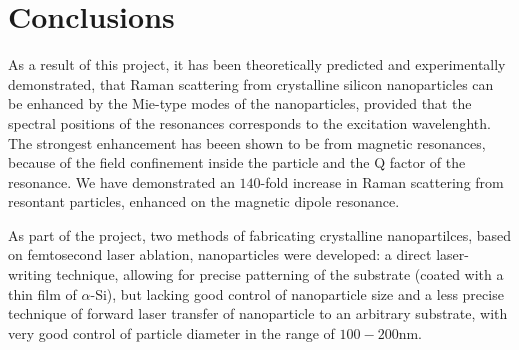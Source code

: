 \section{Conclusions}
    As a result of this project, it has been theoretically predicted and experimentally demonstrated, that Raman scattering
    from crystalline silicon nanoparticles can be enhanced by the Mie-type modes of the nanoparticles, provided that the
    spectral positions of the resonances corresponds to the excitation wavelenghth. The strongest enhancement has beeen shown
    to be from magnetic resonances, because of the field confinement inside the particle and the Q factor of the resonance.
    We have demonstrated an $140$-fold increase in Raman scattering from resontant particles, enhanced on the magnetic dipole
    resonance.

    As part of the project, two methods of fabricating crystalline nanopartilces, based on femtosecond laser ablation,
    nanoparticles were developed: a direct laser-writing technique, allowing for precise patterning of the substrate
    (coated with a thin film of $\alpha$-Si), but lacking good control of nanoparticle size and a less precise technique
    of forward laser transfer of nanoparticle to an arbitrary substrate, with very good control of particle diameter in the
    range of $100-200$nm.
